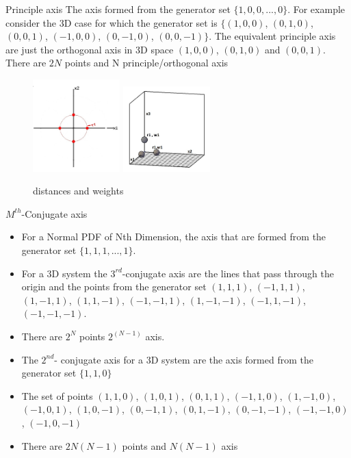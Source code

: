 \documentclass[11pt]{beamer}
\begin{document}
\begin{frame}
\begin{block}{Principle axis}
The axis formed from the generator set $\{1,0,0,...,0\}$. For example consider the 3D case for which the generator set is $\{(1,0,0)$, $(0,1,0)$, $(0,0,1)$, $(-1,0,0)$, $(0,-1,0)$, $(0,0,-1)\}$. The equivalent principle axis are just the orthogonal axis in 3D space $(1,0,0)$, $(0,1,0)$ and $(0,0,1)$. There are $2N$ points and N principle/orthogonal axis
\end{block}
\begin{figure}[h]
	\centering
		\includegraphics[width=0.3\textwidth]{2dprincipleaxis.jpg}
		\includegraphics[width=0.3\textwidth]{3dprincipleaxis.jpg}
	\caption{distances and weights}
\end{figure}
\end{frame}
\begin{frame}
\begin{block}{$M^{th}$-Conjugate axis}
\begin{itemize}[<+->]
\item For a Normal PDF of Nth Dimension, the axis that are formed from the generator set $\{1,1,1,...,1 \}$. 
\item For a 3D system the $3^{rd}$-conjugate axis are the lines that pass through the origin and the points from the generator set $(1,1,1)$, $(-1,1,1)$, $(1,-1,1)$, $(1,1,-1)$, $(-1,-1,1)$, $(1,-1,-1)$, $(-1,1,-1)$, $(-1,-1,-1)$. 
\item There are $2^N$ points $2^{(N-1)}$ axis. 
\item The $2^{nd}$- conjugate axis for a 3D system are the axis formed from the generator set $\{1,1,0\}$ 
\item The set of points $(1,1,0)$, $(1,0,1)$, $(0,1,1)$, $(-1,1,0)$, $(1,-1,0)$, $(-1,0,1)$, $(1,0,-1)$, $(0,-1,1)$, $(0,1,-1)$, $(0,-1,-1)$, $(-1,-1,0)$, $(-1,0,-1)$ 
\item There are $2N(N-1)$ points and $N(N-1)$ axis
\end{itemize}
\end{block}
\end{frame}
\end{document}
